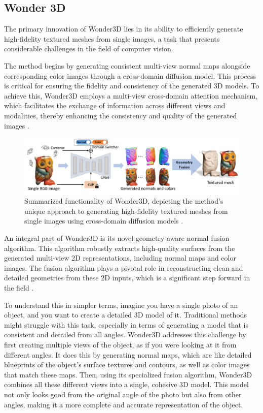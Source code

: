 \subsection{Wonder 3D}\label{Wonder3D}

The primary innovation of Wonder3D lies in its ability to efficiently generate high-fidelity textured meshes from single images, a task that presents considerable challenges in the field of computer vision.

The method begins by generating consistent multi-view normal maps alongside corresponding color images through a cross-domain diffusion model. This process is critical for ensuring the fidelity and consistency of the generated 3D models. To achieve this, Wonder3D employs a multi-view cross-domain attention mechanism, which facilitates the exchange of information across different views and modalities, thereby enhancing the consistency and quality of the generated images \citep{long2023wonder3d}.

\begin{figure}[ht]
  \centering
    \includegraphics[width=1\columnwidth]{figures/Wonder3D.png}
    \caption{Summarized functionality of Wonder3D, depicting the method's unique approach to generating high-fidelity textured meshes from single images using cross-domain diffusion models \citep{long2023wonder3d}.}\label{fig:Wonder3D}
\end{figure}

An integral part of Wonder3D is its novel geometry-aware normal fusion algorithm. This algorithm robustly extracts high-quality surfaces from the generated multi-view 2D representations, including normal maps and color images. The fusion algorithm plays a pivotal role in reconstructing clean and detailed geometries from these 2D inputs, which is a significant step forward in the field \citep{long2023wonder3d}.

To understand this in simpler terms, imagine you have a single photo of an object, and you want to create a detailed 3D model of it. Traditional methods might struggle with this task, especially in terms of generating a model that is consistent and detailed from all angles. Wonder3D addresses this challenge by first creating multiple views of the object, as if you were looking at it from different angles. It does this by generating normal maps, which are like detailed blueprints of the object's surface textures and contours, as well as color images that match these maps. Then, using its specialized fusion algorithm, Wonder3D combines all these different views into a single, cohesive 3D model. This model not only looks good from the original angle of the photo but also from other angles, making it a more complete and accurate representation of the object.